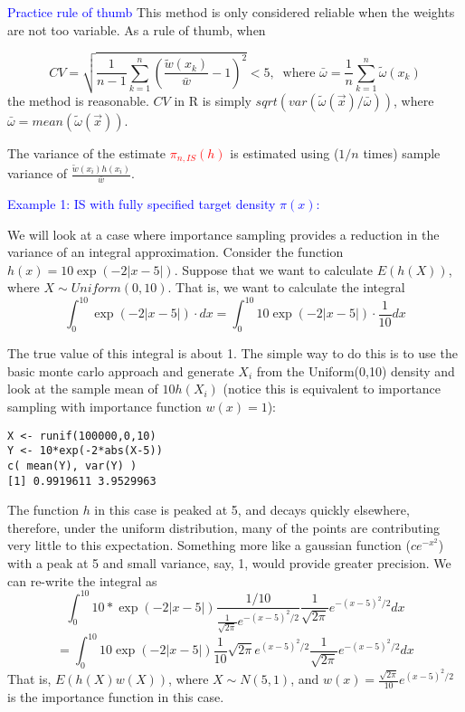 \documentclass[12pt]{article}
\numberwithin{equation}{subsection}
\begin{document}
\noindent
\textcolor{blue}{Practice rule of thumb}
This method is only considered reliable when the weights are not too variable.
As a rule of thumb, when

$$ CV = \sqrt{\frac{1}{n-1} \sum_{k=1}^n \left(\frac{\tilde{w}(x_k)}{\bar{w} } -1\right)^2} < 5, ~ \text{ where } \bar{\omega} = \frac{1}{n}\sum\limits_{k=1}^n\tilde{\omega}(x_k)$$ 
the method is reasonable. $CV$ in R is simply $sqrt(var(\tilde{\omega}(\vec{x})/\bar{\omega}))$, where $\bar{\omega} = mean(\tilde{\omega}(\vec{x}))$. 

The variance of the estimate \textcolor{red}{$\pi_{n, IS}(h)$} is estimated using ($1/n$ times) sample variance of $\frac{\tilde{w}(x_i) h(x_i)}{\bar{w}}$. \newline

\noindent
\textcolor{blue}{Example 1: IS with fully specified target density $\pi(x)$:} 

We will look at a case where importance sampling
provides a reduction in the variance of an integral approximation. Consider the function
$h(x) = 10 \exp (-2|x - 5|)$. Suppose that we want to calculate $E(h(X))$, where $X \sim 
Uniform(0, 10)$. That is, we want to calculate the integral
$$ \int_0^{10} \exp (-2|x - 5|)\cdot dx = \int_0^{10} 10\exp (-2|x - 5|)\cdot\frac{1}{10} dx$$

The true value of this integral is about 1. The simple way to do this is to use the basic monte carlo approach
and generate $X_i$ from the Uniform(0,10) density and look at the sample
mean of $10h(X_i)$ (notice this is equivalent to importance sampling with importance
function $w(x) = 1$):

\begin{verbatim}
X <- runif(100000,0,10)
Y <- 10*exp(-2*abs(X-5))
c( mean(Y), var(Y) )
[1] 0.9919611 3.9529963

\end{verbatim}
The function $h$ in this case is peaked at 5, and decays quickly elsewhere, therefore, under
the uniform distribution, many of the points are contributing very little to this expectation.
Something more like a gaussian function ($ce^{-x^2}$) with a peak at 5 and small variance,
say, 1, would provide greater precision. We can re-write the integral as
$$ \int_0^{10} 10* \exp (-2|x - 5|) \frac{1/10}{\frac{1}{\sqrt{2 \pi}} e^{-(x-5)^2/2} } \frac{1}{\sqrt{2 \pi}} e^{-(x-5)^2/2} dx $$
$$= \int_0^{10} 10\exp (-2|x - 5|) \frac{1}{10}\sqrt{2 \pi} e^{(x-5)^2/2}  \frac{1}{\sqrt{2 \pi}} e^{-(x-5)^2/2} dx $$
That is, $E(h(X)w(X))$, where $X \sim N(5, 1)$, and $w(x) = \frac{\sqrt{2 \pi} }{10}e^{(x-5)^2/2} $ is the importance function in this case.
\end{document}
